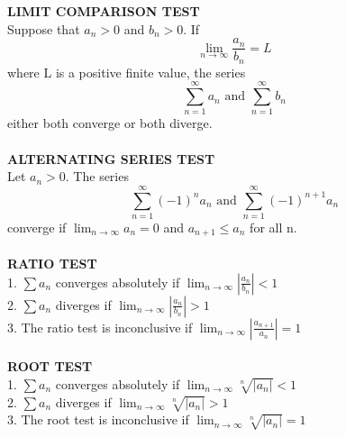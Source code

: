 \documentclass[10pt]{article}
\begin{document}
\noindent
\textbf{LIMIT COMPARISON TEST}
\\
Suppose that $a_n>0$ and $b_n>0$. If $$\lim_{n\to \infty}\frac{a_n}{b_n}=L$$ where L is a positive finite value, 
the series $$\sum_{n=1}^{\infty}a_n\text{ and }\sum_{n=1}^{\infty}b_n$$ either both converge or both diverge. 
\\\\
\textbf{ALTERNATING SERIES TEST}
\\
Let $a_n > 0$. 
The series $$\sum_{n=1}^{\infty}(-1)^na_n\text{ and }\sum_{n=1}^{\infty}(-1)^{n+1}a_n$$ converge if $\lim_{n\to \infty}a_n=0$ and $a_{n+1}\leq{a_n}$ for all n. 
\\\\
\textbf{RATIO TEST}
\\
1. $\sum{a_n}$ converges absolutely if $\lim_{n\to \infty}|\frac{a_n}{b_n}|<1$
\\
2. $\sum{a_n}$ diverges if $\lim_{n\to \infty}|\frac{a_n}{b_n}|>1$
\\
3. The ratio test is inconclusive if $\lim_{n\to \infty}|\frac{a_{n+1}}{a_n}|=1$
\\\\
\textbf{ROOT TEST}
\\
1. $\sum{a_n}$ converges absolutely if $\lim_{n\to \infty}\sqrt[n]{|a_n|}<1$
\\
2. $\sum{a_n}$ diverges if $\lim_{n\to \infty}\sqrt[n]{|a_n|}>1$
\\
3. The root test is inconclusive if $\lim_{n\to \infty}\sqrt[n]{|a_n|}=1$
\end{document}
